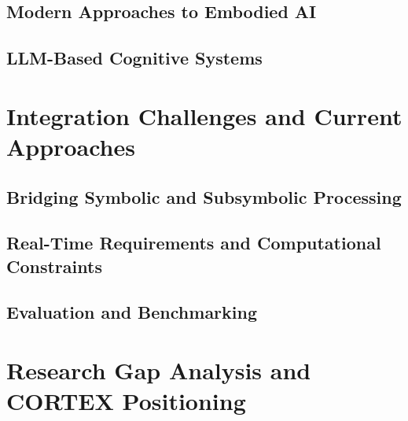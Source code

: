 \subsection{Modern Approaches to Embodied AI}

\subsection{LLM-Based Cognitive Systems}

\section{Integration Challenges and Current Approaches}

\subsection{Bridging Symbolic and Subsymbolic Processing}

\subsection{Real-Time Requirements and Computational Constraints}

\subsection{Evaluation and Benchmarking}

\section{Research Gap Analysis and CORTEX Positioning}

